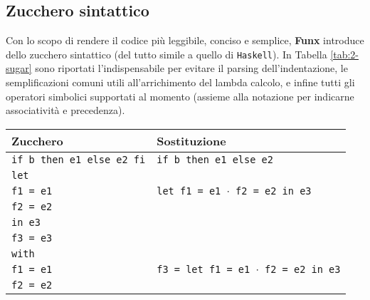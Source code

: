 \subsection{Zucchero sintattico}
\label{sec:2-4-syntactic-sugar}

Con lo scopo di rendere il codice più leggibile, conciso e semplice, \textbf{Funx} introduce
dello zucchero sintattico (del tutto simile a quello di \texttt{Haskell}).
In Tabella \ref{tab:2-sugar} sono riportati l'indispensabile per evitare il parsing dell'indentazione,
le semplificazioni comuni utili all'arrichimento del lambda calcolo, e infine tutti gli operatori simbolici
supportati al momento (assieme alla notazione per indicarne associatività e precedenza).

\newpage

\begin{table}[H]
    \begin{center}
        \renewcommand{\arraystretch}{1.3}
        \begin{tabularx}{\textwidth}{|p{16em}|X|}
            \hline
            \textbf{Zucchero}                & \textbf{Sostituzione}                                            \\
            \hline
            \texttt{if b then e1 else e2 fi} & \texttt{if b then e1 else e2}                                    \\
            \hline
            \texttt{let}                     &                                                                  \\
            \texttt{f1 = e1}                 & \texttt{let f1 = e1 $\cdot$ f2 = e2 in e3}                       \\
            \texttt{f2 = e2}                 &                                                                  \\
            \texttt{in e3}                   &                                                                  \\
            \hline
            \texttt{f3 = e3}                 &                                                                  \\
            \texttt{with}                    &                                                                  \\
            \texttt{f1 = e1}                 & \texttt{f3 = let f1 = e1 $\cdot$ f2 = e2 in e3}                  \\
            \texttt{f2 = e2}                 &                                                                  \\

\end{tabularx}
\end{center}
\end{table}

